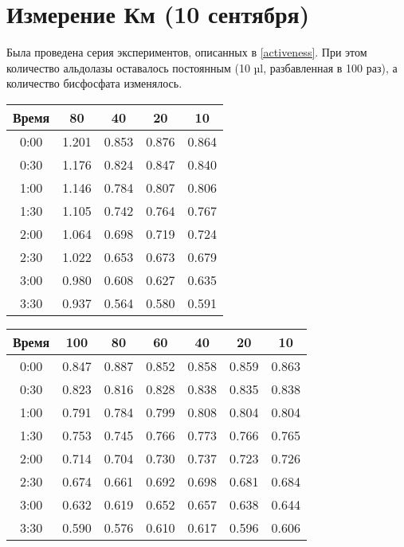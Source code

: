 \section{Измерение Км (10 сентября)}

Была проведена серия экспериментов, описанных в \ref{activeness}.
При этом количество альдолазы оставалось постоянным (10 µl, разбавленная в 100 раз),
а количество бисфосфата изменялось.

\def\svgwidth{\linewidth}

\begin{tabular}{|c|c|c|c|c|}
\hline
Время &  80  & 40    &  20   &  10   \\
\hline
0:00 & 1.201 & 0.853 & 0.876 & 0.864 \\
0:30 & 1.176 & 0.824 & 0.847 & 0.840 \\
1:00 & 1.146 & 0.784 & 0.807 & 0.806 \\
1:30 & 1.105 & 0.742 & 0.764 & 0.767 \\
2:00 & 1.064 & 0.698 & 0.719 & 0.724 \\
2:30 & 1.022 & 0.653 & 0.673 & 0.679 \\
3:00 & 0.980 & 0.608 & 0.627 & 0.635 \\
3:30 & 0.937 & 0.564 & 0.580 & 0.591 \\
\hline
\end{tabular}

\begin{tabular}{|c|c|c|c|c|c|c|}
\hline
Время &  100   &  80   &  60   &  40   &  20   &  10   \\
\hline
0:00  &  0.847 & 0.887 & 0.852 & 0.858 & 0.859 & 0.863 \\
0:30  &  0.823 & 0.816 & 0.828 & 0.838 & 0.835 & 0.838 \\
1:00  &  0.791 & 0.784 & 0.799 & 0.808 & 0.804 & 0.804 \\
1:30  &  0.753 & 0.745 & 0.766 & 0.773 & 0.766 & 0.765 \\
2:00  &  0.714 & 0.704 & 0.730 & 0.737 & 0.723 & 0.726 \\
2:30  &  0.674 & 0.661 & 0.692 & 0.698 & 0.681 & 0.684 \\
3:00  &  0.632 & 0.619 & 0.652 & 0.657 & 0.638 & 0.644 \\
3:30  &  0.590 & 0.576 & 0.610 & 0.617 & 0.596 & 0.606 \\
\hline
\end{tabular}

